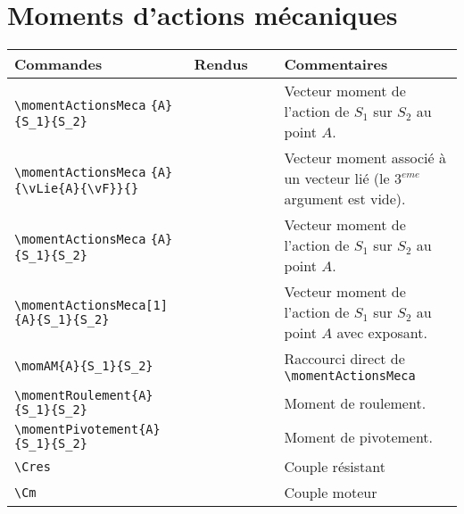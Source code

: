 \documentclass[a4paper,12pt]{article}
\begin{document}
	\section{Moments d'actions mécaniques}
		\noindent
		\begin{tabular}{|p{0.4\linewidth}|p{0.2\linewidth}|p{0.4\linewidth}|}
			\hline
				\textbf{Commandes}&\textbf{Rendus}&\textbf{Commentaires}
			\\\hline\hline
				\verb!\momentActionsMeca! \verb!{A}{S_1}{S_2}!		&	\momentActionsMeca{A}{S_1}{S_2}	&	Vecteur moment de l'action de $S_1$ sur $S_2$ au point $A$.
			\\\hline
				\verb!\momentActionsMeca! \verb!{A}{\vLie{A}{\vF}}{}!	&	\momentActionsMeca{A}{\vLie{A}{\vF}}{}	&	Vecteur moment associé à un vecteur lié (le $3^{eme}$ argument est vide).
			\\\hline
				\verb!\momentActionsMeca! \verb!{A}{S_1}{S_2}!		&	\momentActionsMeca{A}{S_1}{S_2}	&	Vecteur moment de l'action de $S_1$ sur $S_2$ au point $A$.
			\\\hline
				\verb!\momentActionsMeca[1]! \verb!{A}{S_1}{S_2}!	&	\momentActionsMeca[1]{A}{S_1}{S_2}	&	Vecteur moment de l'action de $S_1$ sur $S_2$ au point $A$ avec exposant.
			\\\hline
				\verb!\momAM{A}{S_1}{S_2}!				&	\momAM{A}{S_1}{S_2}		&	Raccourci direct de \verb!\momentActionsMeca!
			\\\hline
				\verb!\momentRoulement{A}! \verb!{S_1}{S_2}!		&	\momentRoulement{A}{S_1}{S_2}		&	Moment de roulement.
			\\\hline
				\verb!\momentPivotement{A}! \verb!{S_1}{S_2}!		&	\momentPivotement{A}{S_1}{S_2}		&	Moment de pivotement.
			\\\hline
				\verb!\Cres!		&	\Cres		&	Couple résistant
			\\\hline
				\verb!\Cm!		&	\Cm		&	Couple moteur
			\\\hline
		\end{tabular}
\end{document}
